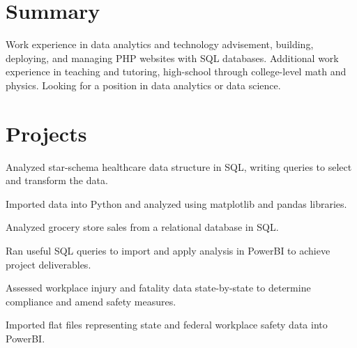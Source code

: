 \documentclass[]{plushcv}
\begin{document}
\begin{paracol}{2}

\switchcolumn[0]

\section{Summary}

Work experience in data analytics and technology advisement, building, deploying, and managing PHP websites with SQL databases. Additional work experience in teaching and tutoring, high-school through college-level math and physics. Looking for a position in data analytics or data science.


\section{Projects}

\begin{tightemize}
	\item Analyzed star-schema healthcare data structure in SQL, writing queries to select and transform the data.
	\item  Imported data into Python and analyzed using matplotlib and pandas libraries.
\end{tightemize}
\sectionsep

\begin{tightemize}
	\item Analyzed grocery store sales from a relational database in SQL.
	\item Ran useful SQL queries to import and apply analysis in PowerBI to achieve project deliverables.
\end{tightemize}
\sectionsep

\begin{tightemize}
	\item Assessed workplace injury and fatality data state-by-state to determine compliance and amend safety measures.
	\item Imported flat files representing state and federal workplace safety data into PowerBI.
\end{tightemize}
\sectionsep


\end{paracol}
\end{document}
